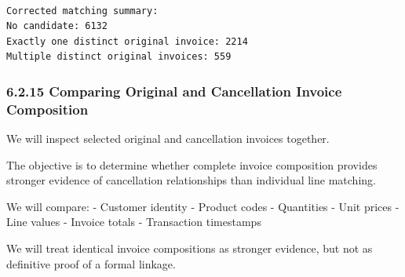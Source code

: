 \documentclass[11pt]{article}
\begin{document}
    
    \begin{Verbatim}[commandchars=\\\{\}]

Corrected matching summary:
No candidate: 6132
Exactly one distinct original invoice: 2214
Multiple distinct original invoices: 559
    \end{Verbatim}

    \subsubsection{6.2.15 Comparing Original and Cancellation Invoice
Composition}\label{comparing-original-and-cancellation-invoice-composition}

We will inspect selected original and cancellation invoices together.

The objective is to determine whether complete invoice composition
provides stronger evidence of cancellation relationships than individual
line matching.

We will compare: - Customer identity - Product codes - Quantities - Unit
prices - Line values - Invoice totals - Transaction timestamps

We will treat identical invoice compositions as stronger evidence, but
not as definitive proof of a formal linkage.
\end{document}
